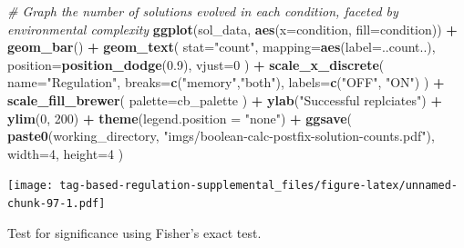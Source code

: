 \documentclass[]{book}
\newenvironment{Shaded}{\begin{snugshade}}{\end{snugshade}}
\newcommand{\CommentTok}[1]{\textcolor[rgb]{0.56,0.35,0.01}{\textit{#1}}}
\newcommand{\DataTypeTok}[1]{\textcolor[rgb]{0.13,0.29,0.53}{#1}}
\newcommand{\DecValTok}[1]{\textcolor[rgb]{0.00,0.00,0.81}{#1}}
\newcommand{\FloatTok}[1]{\textcolor[rgb]{0.00,0.00,0.81}{#1}}
\newcommand{\KeywordTok}[1]{\textcolor[rgb]{0.13,0.29,0.53}{\textbf{#1}}}
\newcommand{\NormalTok}[1]{#1}
\newcommand{\OperatorTok}[1]{\textcolor[rgb]{0.81,0.36,0.00}{\textbf{#1}}}
\newcommand{\StringTok}[1]{\textcolor[rgb]{0.31,0.60,0.02}{#1}}
\begin{document}
\begin{Shaded}
\begin{Highlighting}[]
\CommentTok{# Graph the number of solutions evolved in each condition, faceted by environmental complexity}
\KeywordTok{ggplot}\NormalTok{(sol_data, }\KeywordTok{aes}\NormalTok{(}\DataTypeTok{x=}\NormalTok{condition, }\DataTypeTok{fill=}\NormalTok{condition)) }\OperatorTok{+}
\StringTok{  }\KeywordTok{geom_bar}\NormalTok{() }\OperatorTok{+}
\StringTok{  }\KeywordTok{geom_text}\NormalTok{(}
    \DataTypeTok{stat=}\StringTok{"count"}\NormalTok{,}
    \DataTypeTok{mapping=}\KeywordTok{aes}\NormalTok{(}\DataTypeTok{label=}\NormalTok{..count..),}
    \DataTypeTok{position=}\KeywordTok{position_dodge}\NormalTok{(}\FloatTok{0.9}\NormalTok{),}
    \DataTypeTok{vjust=}\DecValTok{0}
\NormalTok{  ) }\OperatorTok{+}
\StringTok{  }\KeywordTok{scale_x_discrete}\NormalTok{(}
    \DataTypeTok{name=}\StringTok{"Regulation"}\NormalTok{,}
    \DataTypeTok{breaks=}\KeywordTok{c}\NormalTok{(}\StringTok{"memory"}\NormalTok{,}\StringTok{"both"}\NormalTok{),}
    \DataTypeTok{labels=}\KeywordTok{c}\NormalTok{(}\StringTok{"OFF"}\NormalTok{, }\StringTok{"ON"}\NormalTok{)}
\NormalTok{  ) }\OperatorTok{+}
\StringTok{  }\KeywordTok{scale_fill_brewer}\NormalTok{(}
    \DataTypeTok{palette=}\NormalTok{cb_palette}
\NormalTok{  ) }\OperatorTok{+}
\StringTok{  }\KeywordTok{ylab}\NormalTok{(}\StringTok{"Successful replciates"}\NormalTok{) }\OperatorTok{+}
\StringTok{  }\KeywordTok{ylim}\NormalTok{(}\DecValTok{0}\NormalTok{, }\DecValTok{200}\NormalTok{) }\OperatorTok{+}
\StringTok{  }\KeywordTok{theme}\NormalTok{(}\DataTypeTok{legend.position =} \StringTok{"none"}\NormalTok{) }\OperatorTok{+}
\StringTok{  }\KeywordTok{ggsave}\NormalTok{(}
    \KeywordTok{paste0}\NormalTok{(working_directory, }\StringTok{"imgs/boolean-calc-postfix-solution-counts.pdf"}\NormalTok{),}
    \DataTypeTok{width=}\DecValTok{4}\NormalTok{,}
    \DataTypeTok{height=}\DecValTok{4}
\NormalTok{  )}
\end{Highlighting}
\end{Shaded}

\texttt{[image: tag-based-regulation-supplemental\_files/figure-latex/unnamed-chunk-97-1.pdf]}

Test for significance using Fisher's exact test.
\end{document}
